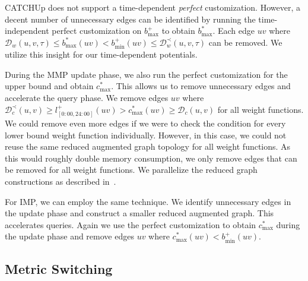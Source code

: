 \documentclass[a4paper,UKenglish,cleveref, autoref, thm-restate,anonymous]{lipics-v2021}
\newcommand*{\comb}{c}
\newcommand*{\dist}{\mathcal{D}}
\begin{document}
CATCHUp does not support a time-dependent \emph{perfect} customization.
However, a decent number of unnecessary edges can be identified by running the time-independent perfect customization on $b^+_{\max}$ to obtain $b^*_{\max}$.
Each edge $uv$ where $\dist_w(u,v,\tau) \leq b^*_{\max}(uv) < b^+_{\min}(uv) \leq \dist^{\prec}_w(u,v,\tau)$ can be removed.
We utilize this insight for our time-dependent potentials.

During the MMP update phase, we also run the perfect customization for the upper bound and obtain $\comb^*_{\max}$.
This allows us to remove unnecessary edges and accelerate the query phase.
We remove edges $uv$ where $\dist^{\prec}_c(u,v) \geq l_{[0:00, 24:00]}^+(uv) > \comb^*_{\max}(uv) \geq \dist_c(u,v)$ for all weight functions.
We could remove even more edges if we were to check the condition for every lower bound weight function individually.
However, in this case, we could not reuse the same reduced augmented graph topology for all weight functions.
As this would roughly double memory consumption, we only remove edges that can be removed for all weight functions.
We parallelize the reduced graph constructions as described in~\cite{bsw-rttau-19}.

For IMP, we can employ the same technique.
We identify unnecessary edges in the update phase and construct a smaller reduced augmented graph.
This accelerates queries.
Again we use the perfect customization to obtain $\comb^*_{\max}$ during the update phase and remove edges $uv$ where $\comb^*_{\max}(uv) < b^+_{\min}(uv)$.%

\subsection{Metric Switching}
\end{document}
